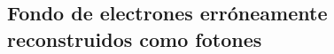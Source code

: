 \begin{table}[!ht]
{\begin{tabular}{c|l|ccc}

  \end{tabular}
  }
  \label{tab:jfake_ff}
\end{table}



\subsection{Fondo de electrones erróneamente reconstruidos como fotones}\label{sec:efakes}

